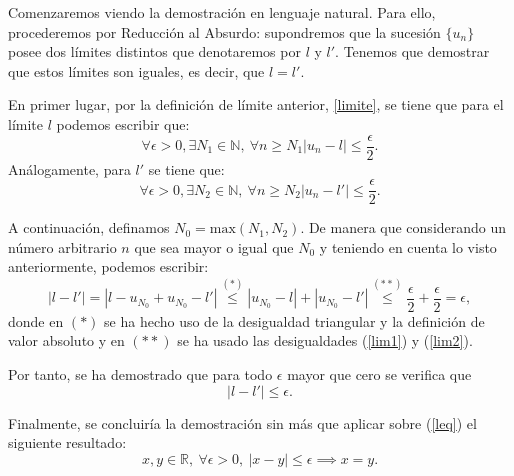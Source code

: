 \begin{demostracion}
  Comenzaremos viendo la demostración en lenguaje natural. Para ello, procederemos por Reducción al Absurdo: supondremos que la sucesión \( \{ u_n\}\) posee dos límites distintos que denotaremos por \( l\) y \(l'\). Tenemos que demostrar que estos límites son iguales, es decir, que \(l=l'\). 
  
  En primer lugar, por la definición de límite anterior, \ref{limite}, se tiene que para el límite \(l \) podemos escribir que:
  \begin{equation}\label{lim1}
  \forall \epsilon >0, \exists N_1 \in \mathbb{N}, \ \forall n \geq N_1 |u_n-l| \leq \frac{\epsilon}{2}.
  \end{equation}
  Análogamente, para \(l'\) se tiene que:
  \begin{equation}\label{lim2}
  \forall \epsilon >0, \exists N_2 \in \mathbb{N}, \ \forall n \geq N_2 |u_n-l'| \leq \frac{\epsilon}{2}.
  \end{equation}
  
  A continuación, definamos \( N_0 = \text{max} (N_1,N_2)\). De manera que considerando un número arbitrario \(n\) que  sea mayor o igual que \(N_0\) y teniendo en cuenta lo visto anteriormente, podemos escribir:
  \begin{equation*}
  |l-l'|=|l-u_{N_0}+u_{N_0}-l'| \stackrel{(*)}{\leq} |u_{N_0}-l|+|u_{N_0}-l'| \stackrel{(**)}{\leq} \frac{\epsilon}{2}+\frac{\epsilon}{2}=\epsilon,
  \end{equation*}
  donde en \((*)\) se ha hecho uso de la desigualdad triangular y la definición de valor absoluto y en \((**)\) se ha usado las desigualdades (\ref{lim1}) y (\ref{lim2}).
  
  Por tanto, se ha demostrado que para todo \(\epsilon\) mayor que cero se verifica que
  \begin{equation}\label{leq}
  |l-l'| \leq \epsilon.
  \end{equation} 
  
   Finalmente, se concluiría la demostración sin más que aplicar sobre (\ref{leq}) el siguiente resultado:
	\begin{equation}
  	x,y \in \mathbb{R}, \ \forall \epsilon >0, \ |x-y| \leq \epsilon \implies x=y.
  	\end{equation}
\end{demostracion}

